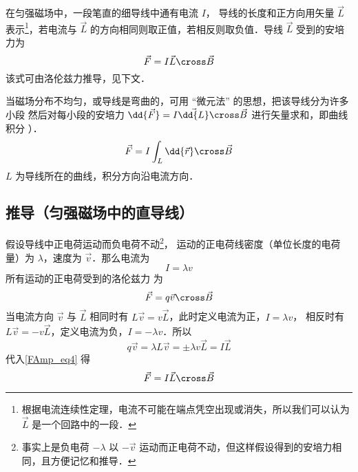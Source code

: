 

在匀强磁场中，一段笔直的细导线中通有电流 $I$， 导线的长度和正方向用矢量 $\vec L$ 表示\footnote{根据电流连续性定理，电流不可能在端点凭空出现或消失，所以我们可以认为 $\vec L$ 是一个回路中的一段．}，若电流与 $\vec L$ 的方向相同则取正值，若相反则取负值．导线 $\vec L$ 受到的安培力为
\begin{equation}
\vec F = I \vec L \cross \vec B
\end{equation}
该式可由洛伦兹力推导，见下文．

当磁场分布不均匀，或导线是弯曲的，可用 “微元法” 的思想，把该导线分为许多小段
然后对每小段的安培力 $\dd{\vec F} = I\vec \dd{L} \cross\vec B$ 进行矢量求和，即曲线积分%
）．
\begin{equation}
\vec F = I\int_L \dd{\vec r} \cross \vec B
\end{equation}
$L$ 为导线所在的曲线，积分方向沿电流方向．

\subsection{推导（匀强磁场中的直导线）}
假设导线中正电荷运动而负电荷不动\footnote{事实上是负电荷 $-\lambda$ 以 $-\vec v$ 运动而正电荷不动，但这样假设得到的安培力相同，且方便记忆和推导．}， 运动的正电荷线密度（单位长度的电荷量）为 $\lambda$，速度为 $\vec v$．那么电流为%
\begin{equation}
I = \lambda v
\end{equation}
所有运动的正电荷受到的洛伦兹力%
为
\begin{equation}\label{FAmp_eq4}
\vec F =  q\vec v \cross \vec B
\end{equation}
当电流方向 $\vec v$ 与 $\vec L$ 相同时有 $L \vec v = v \vec L$，此时定义电流为正，$I = \lambda v$， 相反时有 $L \vec v = -v\vec L$，定义电流为负，$I = -\lambda v$．所以
\begin{equation}
q\vec v = \lambda L \vec v = \pm \lambda v\vec L= I \vec L
\end{equation}
代入\autoref{FAmp_eq4} 得
\begin{equation}
\vec F = I \vec L \cross \vec B
\end{equation}


















